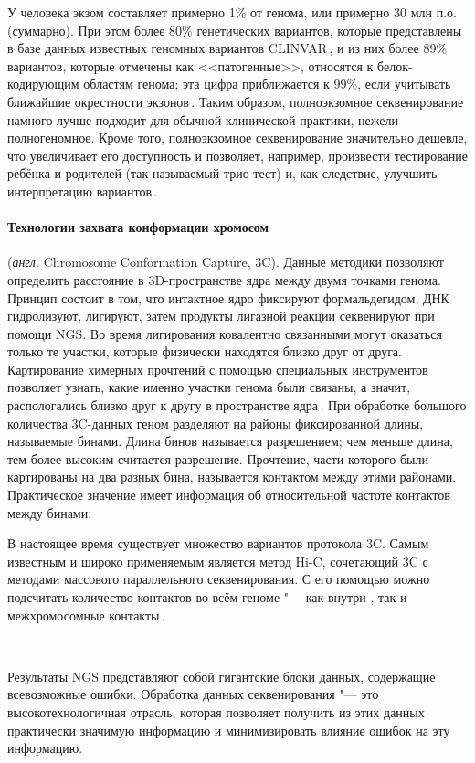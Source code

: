 \documentclass[a4paper,14pt]{extarticle}
\newcommand{\anglia}[1]{\textit{англ.} \textenglish{#1}}
\begin{document}
У человека экзом составляет примерно 1\% от генома, или примерно 30 млн п.о. (суммарно).
При этом более 80\% генетических вариантов, которые представлены в базе данных известных геномных вариантов CLINVAR\,\cite{Landrum_2017}, и из них более 89\% вариантов, которые отмечены как <<патогенные>>, относятся к белок-кодирующим областям генома;
эта цифра приближается к 99\%, если учитывать ближайшие окрестности экзонов\,\cite{Barbitoff_2020}.
Таким образом, полноэкзомное секвенирование намного лучше подходит для обычной клинической практики, нежели полногеномное.
Кроме того, полноэкзомное секвенирование значительно дешевле, что увеличивает его доступность и позволяет, например, произвести тестирование ребёнка и родителей (так называемый трио-тест) и, как следствие, улучшить интерпретацию вариантов\,\cite{Yohe_2017}.

\paragraph{Технологии захвата конформации хромосом} (\anglia{Chromosome Conformation Capture, 3C}).
Данные методики позволяют определить расстояние в 3D-пространстве ядра между двумя точками генома.
Принцип состоит в том, что интактное ядро фиксируют формальдегидом, ДНК гидролизуют, лигируют, затем продукты лигазной реакции секвенируют при помощи NGS.
Во время лигирования ковалентно связанными могут оказаться только те участки, которые физически находятся близко друг от друга.
Картирование химерных прочтений с помощью специальных инструментов позволяет узнать, какие именно участки генома были связаны, а значит, распологались близко друг к другу в пространстве ядра\,\cite{Lieberman_Aiden_2009}.
При обработке большого количества 3C-данных геном разделяют на районы фиксированной длины, называемые бинами.
Длина бинов называется разрешением; чем меньше длина, тем более высоким считается разрешение.
Прочтение, части которого были картированы на два разных бина, называется контактом между этими районами.
Практическое значение имеет информация об относительной частоте контактов между бинами.

В настоящее время существует множество вариантов протокола 3C.
Самым известным и широко применяемым является метод Hi-C, сочетающий 3C с методами массового параллельного секвенирования.
С его помощью можно подсчитать количество контактов во всём геноме "--- как внутри-, так и межхромосомные контакты\,\cite{Oluwadare_2019}.

~

Результаты NGS представляют собой гигантские блоки данных, содержащие всевозможные ошибки.
Обработка данных секвенирования "--- это высокотехнологичная отрасль, которая позволяет получить из этих данных практически значимую информацию и минимизировать влияние ошибок на эту информацию.
\end{document}
